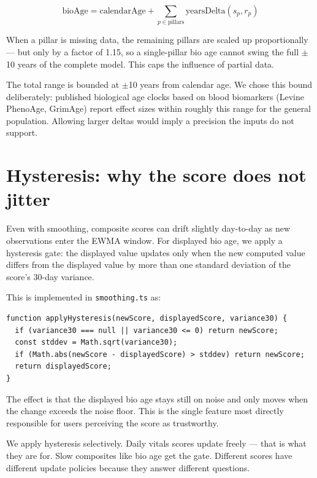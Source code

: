 \documentclass[11pt, a4paper]{article}
\begin{document}
\begin{equation}
\text{bioAge} = \text{calendarAge} + \sum_{p \in \text{pillars}} \text{yearsDelta}(s_p, r_p)
\end{equation}

When a pillar is missing data, the remaining pillars are scaled up proportionally --- but only by a factor of 1.15, so a single-pillar bio age cannot swing the full $\pm$10 years of the complete model. This caps the influence of partial data.

The total range is bounded at $\pm$10 years from calendar age. We chose this bound deliberately: published biological age clocks based on blood biomarkers (Levine PhenoAge, GrimAge) report effect sizes within roughly this range for the general population. Allowing larger deltas would imply a precision the inputs do not support.

\section{Hysteresis: why the score does not jitter}

Even with smoothing, composite scores can drift slightly day-to-day as new observations enter the EWMA window. For displayed bio age, we apply a hysteresis gate: the displayed value updates only when the new computed value differs from the displayed value by more than one standard deviation of the score's 30-day variance.

This is implemented in \texttt{smoothing.ts} as:

\begin{lstlisting}
function applyHysteresis(newScore, displayedScore, variance30) {
  if (variance30 === null || variance30 <= 0) return newScore;
  const stddev = Math.sqrt(variance30);
  if (Math.abs(newScore - displayedScore) > stddev) return newScore;
  return displayedScore;
}
\end{lstlisting}

The effect is that the displayed bio age stays still on noise and only moves when the change exceeds the noise floor. This is the single feature most directly responsible for users perceiving the score as trustworthy.

We apply hysteresis selectively. Daily vitals scores update freely --- that is what they are for. Slow composites like bio age get the gate. Different scores have different update policies because they answer different questions.
\end{document}
